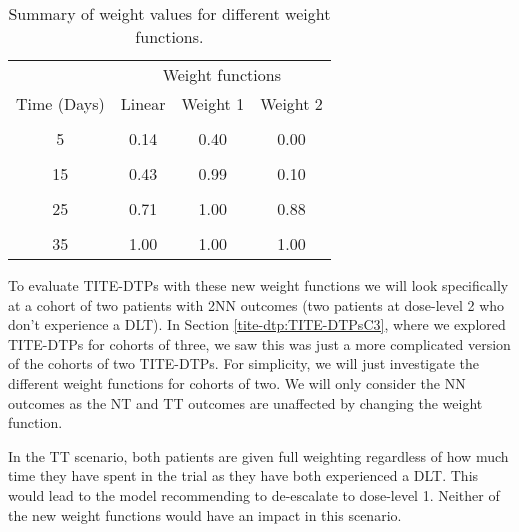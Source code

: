 \begin{table}[H]
	\caption{\label{tab_tite-dtp:AltWeightSumm}Summary of weight values for different weight functions.}
	\centering
	\begin{tabular}[t]{cccc}
		\toprule
		\multicolumn{1}{c}{} & \multicolumn{3}{c}{Weight functions} \\
		\cmidrule(l{3pt}r{3pt}){2-4}
		Time (Days) & Linear & Weight 1 & Weight 2\\
		\midrule
		\cellcolor{gray!6}{0} & \cellcolor{gray!6}{0.00} & \cellcolor{gray!6}{0.00} & \cellcolor{gray!6}{0.00}\\
		5 & 0.14 & 0.40 & 0.00\\
		\cellcolor{gray!6}{10} & \cellcolor{gray!6}{0.29} & \cellcolor{gray!6}{0.87} & \cellcolor{gray!6}{0.01}\\
		15 & 0.43 & 0.99 & 0.10\\
		\cellcolor{gray!6}{20} & \cellcolor{gray!6}{0.57} & \cellcolor{gray!6}{1.00} & \cellcolor{gray!6}{0.43}\\
		25 & 0.71 & 1.00 & 0.88\\
		\cellcolor{gray!6}{30} & \cellcolor{gray!6}{0.86} & \cellcolor{gray!6}{1.00} & \cellcolor{gray!6}{1.00}\\
		35 & 1.00 & 1.00 & 1.00\\
		\bottomrule
	\end{tabular}
\end{table}

To evaluate TITE-DTPs with these new weight functions we will look specifically at a cohort of two patients with 2NN outcomes (two patients at dose-level 2 who don't experience a DLT). In Section \ref{tite-dtp:TITE-DTPsC3}, where we explored TITE-DTPs for cohorts of three, we saw this was just a more complicated version of the cohorts of two TITE-DTPs. For simplicity, we will just investigate the different weight functions for cohorts of two. We will only consider the NN outcomes as the NT and TT outcomes are unaffected by changing the weight function.   

In the TT scenario, both patients are given full weighting regardless of how much time they have spent in the trial as they have both experienced a DLT. This would lead to the model recommending to de-escalate to dose-level 1. Neither of the new weight functions would have an impact in this scenario. 

